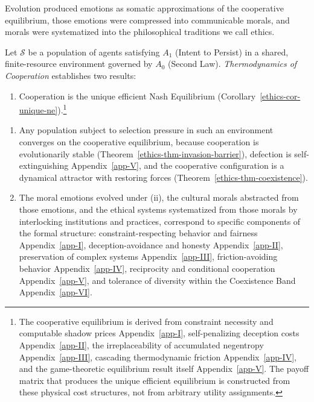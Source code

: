 \documentclass[11pt]{article}
\theoremstyle{plain}
\theoremstyle{definition}
\theoremstyle{remark}
\providecommand{\tightlist}{%
  \setlength{\itemsep}{0pt}\setlength{\parskip}{0pt}}
\begin{document}
Evolution produced emotions as somatic approximations of the cooperative
equilibrium, those emotions were compressed into communicable morals,
and morals were systematized into the philosophical traditions we call
ethics.

Let \(\mathcal{S}\) be a population of agents satisfying \(A_1\) (Intent
to Persist) in a shared, finite-resource environment governed by \(A_0\)
(Second Law). \emph{Thermodynamics of Cooperation} establishes two
results:

\begin{enumerate}
\def\labelenumi{(\roman{enumi})}
\tightlist
\item
  Cooperation is the unique efficient Nash Equilibrium
  (Corollary~\ref{ethics-cor-unique-ne}).\footnote{The cooperative
    equilibrium is derived from constraint necessity and computable
    shadow prices Appendix~\ref{app-I}, self-penalizing deception costs
    Appendix~\ref{app-II}, the irreplaceability of accumulated
    negentropy Appendix~\ref{app-III}, cascading thermodynamic friction
    Appendix~\ref{app-IV}, and the game-theoretic equilibrium result
    itself Appendix~\ref{app-V}. The payoff matrix that produces the
    unique efficient equilibrium is constructed from these physical cost
    structures, not from arbitrary utility assignments.}
\end{enumerate}

\begin{enumerate}
\def\labelenumi{(\roman{enumi})}
\setcounter{enumi}{1}
\item
  Any population subject to selection pressure in such an environment
  converges on the cooperative equilibrium, because cooperation is
  evolutionarily stable (Theorem~\ref{ethics-thm-invasion-barrier}),
  defection is self-extinguishing Appendix~\ref{app-V}, and the
  cooperative configuration is a dynamical attractor with restoring
  forces (Theorem~\ref{ethics-thm-coexistence}).
\item
  The moral emotions evolved under (ii), the cultural morals abstracted
  from those emotions, and the ethical systems systematized from those
  morals by interlocking institutions and practices, correspond to
  specific components of the formal structure: constraint-respecting
  behavior and fairness Appendix~\ref{app-I}, deception-avoidance and
  honesty Appendix~\ref{app-II}, preservation of complex systems
  Appendix~\ref{app-III}, friction-avoiding behavior
  Appendix~\ref{app-IV}, reciprocity and conditional cooperation
  Appendix~\ref{app-V}, and tolerance of diversity within the
  Coexistence Band Appendix~\ref{app-VI}.
\end{enumerate}
\end{document}
